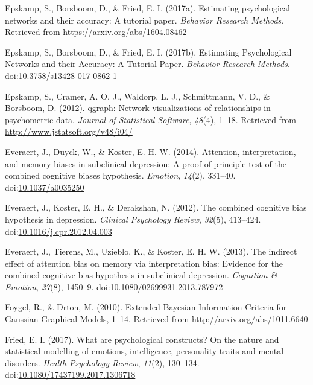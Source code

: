 \documentclass[man,floatsintext]{apa6}
\begin{document}
\leavevmode\hypertarget{ref-R-bootnet}{}%
Epskamp, S., Borsboom, D., \& Fried, E. I. (2017a). Estimating psychological networks and their accuracy: A tutorial paper. \emph{Behavior Research Methods}. Retrieved from \url{https://arxiv.org/abs/1604.08462}

\leavevmode\hypertarget{ref-epskamp_estimating_2017}{}%
Epskamp, S., Borsboom, D., \& Fried, E. I. (2017b). Estimating Psychological Networks and their Accuracy: A Tutorial Paper. \emph{Behavior Research Methods}. doi:\href{https://doi.org/10.3758/s13428-017-0862-1}{10.3758/s13428-017-0862-1}

\leavevmode\hypertarget{ref-R-qgraph}{}%
Epskamp, S., Cramer, A. O. J., Waldorp, L. J., Schmittmann, V. D., \& Borsboom, D. (2012). qgraph: Network visualizations of relationships in psychometric data. \emph{Journal of Statistical Software}, \emph{48}(4), 1--18. Retrieved from \url{http://www.jstatsoft.org/v48/i04/}

\leavevmode\hypertarget{ref-Everaert2014}{}%
Everaert, J., Duyck, W., \& Koster, E. H. W. (2014). Attention, interpretation, and memory biases in subclinical depression: A proof-of-principle test of the combined cognitive biases hypothesis. \emph{Emotion}, \emph{14}(2), 331--40. doi:\href{https://doi.org/10.1037/a0035250}{10.1037/a0035250}

\leavevmode\hypertarget{ref-everaert_combined_2012}{}%
Everaert, J., Koster, E. H., \& Derakshan, N. (2012). The combined cognitive bias hypothesis in depression. \emph{Clinical Psychology Review}, \emph{32}(5), 413--424. doi:\href{https://doi.org/10.1016/j.cpr.2012.04.003}{10.1016/j.cpr.2012.04.003}

\leavevmode\hypertarget{ref-Everaert2013}{}%
Everaert, J., Tierens, M., Uzieblo, K., \& Koster, E. H. W. (2013). The indirect effect of attention bias on memory via interpretation bias: Evidence for the combined cognitive bias hypothesis in subclinical depression. \emph{Cognition \& Emotion}, \emph{27}(8), 1450--9. doi:\href{https://doi.org/10.1080/02699931.2013.787972}{10.1080/02699931.2013.787972}

\leavevmode\hypertarget{ref-foygel_extended_2010}{}%
Foygel, R., \& Drton, M. (2010). Extended Bayesian Information Criteria for Gaussian Graphical Models, 1--14. Retrieved from \url{http://arxiv.org/abs/1011.6640}

\leavevmode\hypertarget{ref-fried_what_2017}{}%
Fried, E. I. (2017). What are psychological constructs? On the nature and statistical modelling of emotions, intelligence, personality traits and mental disorders. \emph{Health Psychology Review}, \emph{11}(2), 130--134. doi:\href{https://doi.org/10.1080/17437199.2017.1306718}{10.1080/17437199.2017.1306718}
\end{document}
